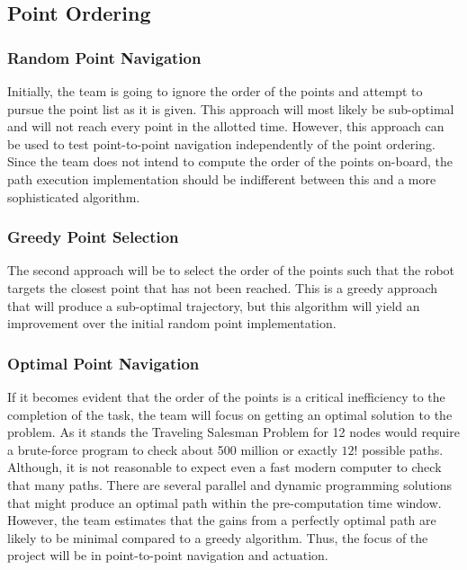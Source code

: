 \documentclass[11pt,conference,onecolumn]{article} %
\begin{document}
\subsection*{Point Ordering}
\subsubsection*{Random Point Navigation}
Initially, the team is going to ignore the order of the points and attempt to pursue the point list as it is given. This approach will most likely be sub-optimal and will not reach every point in the allotted time. However, this approach can be used to test point-to-point navigation independently of the point ordering. Since the team does not intend to compute the order of the points on-board, the path execution implementation should be indifferent between this and a more sophisticated algorithm.
\subsubsection*{Greedy Point Selection}
The second approach will be to select the order of the points such that the robot targets the closest point that has not been reached. This is a greedy approach that will produce a sub-optimal trajectory, but this algorithm will yield an improvement over the initial random point implementation.
\subsubsection*{Optimal Point Navigation}
If it becomes evident that the order of the points is a critical inefficiency to the completion of the task, the team will focus on getting an optimal solution to the problem. As it stands the Traveling Salesman Problem for 12 nodes would require a brute-force program to check about 500 million or exactly $12!$ possible paths. Although, it is not reasonable to expect even a fast modern computer to check that many paths. There are several parallel and dynamic programming solutions that might produce an optimal path within the pre-computation time window. However, the team estimates that the gains from a perfectly optimal path are likely to be minimal compared to a greedy algorithm. Thus, the focus of the project will be in point-to-point navigation and actuation.
\end{document}
